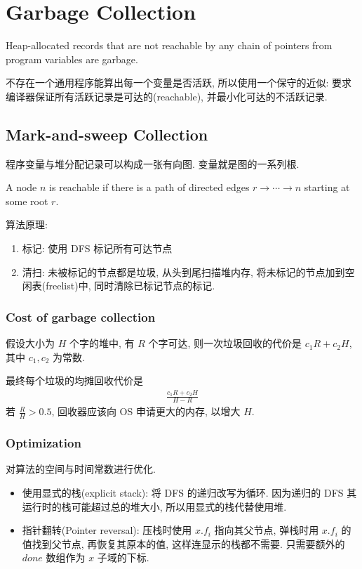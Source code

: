 \section{Garbage Collection}
\begin{definition}[Garbage]
    Heap-allocated records that are not reachable by any chain of pointers from program variables are garbage.
\end{definition}

不存在一个通用程序能算出每一个变量是否活跃, 所以使用一个保守的近似: 要求编译器保证所有活跃记录是可达的(reachable), 并最小化可达的不活跃记录. 

\subsection{Mark-and-sweep Collection}
程序变量与堆分配记录可以构成一张有向图. 变量就是图的一系列根.

\begin{definition}[reachable]
    A node $n$ is reachable if there is a path of directed edges $r \to\cdots \to  n$ starting at some root $r$.
\end{definition}

算法原理:
\begin{enumerate}
    \item 标记: 使用 DFS 标记所有可达节点
    \item 清扫: 未被标记的节点都是垃圾, 从头到尾扫描堆内存, 将未标记的节点加到空闲表(freelist)中, 同时清除已标记节点的标记. 
\end{enumerate}

\subsubsection{Cost of garbage collection}
假设大小为 $H$ 个字的堆中, 有 $R$ 个字可达, 则一次垃圾回收的代价是 $c_1R+c_2H$, 其中 $c_1, c_2$ 为常数. 

最终每个垃圾的均摊回收代价是 
\begin{align*}
    \frac{c_1R+c_2H}{H-R}
\end{align*}
若 $\frac{R}{H}>0.5$, 回收器应该向 OS 申请更大的内存, 以增大 $H$.

\subsubsection{Optimization}
对算法的空间与时间常数进行优化. 

\begin{itemize}
    \item 使用显式的栈(explicit stack): 将 DFS 的递归改写为循环. 因为递归的 DFS 其运行时的栈可能超过总的堆大小, 所以用显式的栈代替使用堆.
    \item 指针翻转(Pointer reversal): 压栈时使用 $x.f_i$ 指向其父节点, 弹栈时用  $x.f_i$ 的值找到父节点, 再恢复其原本的值, 这样连显示的栈都不需要. 只需要额外的 $done$ 数组作为 $x$ 子域的下标.
\end{itemize}


